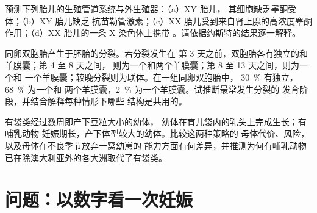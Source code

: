 \begin{exercise}[$\star\star\star$]\label{exo:b2:mammal-reproduction:10}
预测下列胎儿的生殖管道系统与外生殖器：（a）XY 胎儿，
其细胞缺乏睾酮受体；（b）XY 胎儿缺乏
抗苗勒管激素；（c）XX 胎儿受到来自肾上腺的高浓度睾酮
作用；（d）XX 胎儿的一条 X 染色体上携带
\emph{}。请依据约斯特的结果逐一解释。
\end{exercise}

\begin{exercise}[$\star\star\star$]\label{exo:b2:mammal-reproduction:11}
同卵双胞胎产生于胚胎的分裂。若分裂发生在
第 3 天之前，双胞胎各有独立的和羊膜囊；第 4 至 8 天之间，
则为一个和两个羊膜囊；第 8 至 13 天之间，则为一个和
一个羊膜囊；较晚分裂则为联体。在一组同卵双胞胎中，
\qty{30}{\%} 有独立，\qty{68}{\%} 为一个和
两个羊膜囊，\qty{2}{\%} 为一个羊膜囊。试推断最常发生分裂的
发育阶段，并结合解释每种情形下哪些
结构是共用的。
\end{exercise}

\begin{exercise}[$\star\star\star$]\label{exo:b2:mammal-reproduction:12}
有袋类经过数周即产下豆粒大小的幼体，
幼体在育儿袋内的乳头上完成生长；有哺乳动物
妊娠期长，产下体型较大的幼体。比较这两种策略的
母体代价、风险，以及母体在不良季节放弃一窝幼崽的
能力方面有何差异，并推测为何有哺乳动物
已在除澳大利亚外的各大洲取代了有袋类。
\end{exercise}

\section{问题：以数字看一次妊娠}

